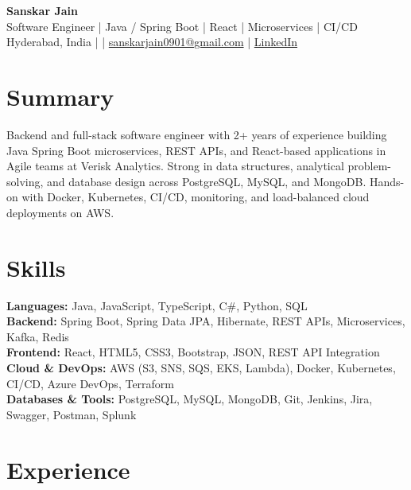 \documentclass[10pt,letterpaper]{article}
\begin{document}
\begin{center}
    {\Large \textbf{Sanskar Jain}} \\
    Software Engineer \;|\; Java / Spring Boot \;|\; React \;|\; Microservices \;|\; CI/CD \\
    Hyderabad, India \enspace |  \enspace | \enspace
    \href{mailto:sanskarjain0901@gmail.com}{sanskarjain0901@gmail.com} \enspace | \enspace
    \href{https://www.linkedin.com/in/sanskar-jain0901/}{LinkedIn}
\end{center}

\vspace{2pt}

\section*{Summary}
Backend and full-stack software engineer with 2+ years of experience building Java Spring Boot microservices, REST APIs, and React-based applications in Agile teams at Verisk Analytics. Strong in data structures, analytical problem-solving, and database design across PostgreSQL, MySQL, and MongoDB. Hands-on with Docker, Kubernetes, CI/CD, monitoring, and load-balanced cloud deployments on AWS.

\section*{Skills}
\textbf{Languages:} Java, JavaScript, TypeScript, C\#, Python, SQL \\
\textbf{Backend:} Spring Boot, Spring Data JPA, Hibernate, REST APIs, Microservices, Kafka, Redis \\
\textbf{Frontend:} React, HTML5, CSS3, Bootstrap, JSON, REST API Integration \\
\textbf{Cloud \& DevOps:} AWS (S3, SNS, SQS, EKS, Lambda), Docker, Kubernetes, CI/CD, Azure DevOps, Terraform \\
\textbf{Databases \& Tools:} PostgreSQL, MySQL, MongoDB, Git, Jenkins, Jira, Swagger, Postman, Splunk

\section*{Experience}
\end{document}

